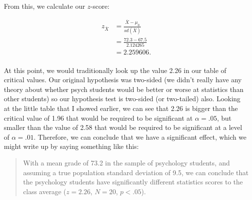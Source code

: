 From this, we calculate our $z$-score:

\begin{align*}
  z_{\overline{X}} &= \frac{\overline{X}-\mu_0}{sd(\overline{X})}\\
                   &= \frac{72.3-67.5}{2.124265}\\
                   &= 2.259606.\\
\end{align*}

At this point, we would traditionally look up the value 2.26 in our table of critical values. Our original hypothesis was two-sided (we didn't really have any theory about whether psych students would be better or worse at statistics than other students) so our hypothesis test is two-sided (or two-tailed) also. Looking at the little table that I showed earlier, we can see that 2.26 is bigger than the critical value of 1.96 that would be required to be significant at $\alpha = .05$, but smaller than the value of 2.58 that would be required to be significant at a level of $\alpha = .01$. Therefore, we can conclude that we have a significant effect, which we might write up by saying something like this:
\begin{quote}
With a mean grade of 73.2 in the sample of psychology students, and assuming a true population standard deviation of 9.5, we can conclude that the psychology students have significantly different statistics scores to the class average ($z = 2.26$, $N=20$, $p<.05$). 
\end{quote}
 

